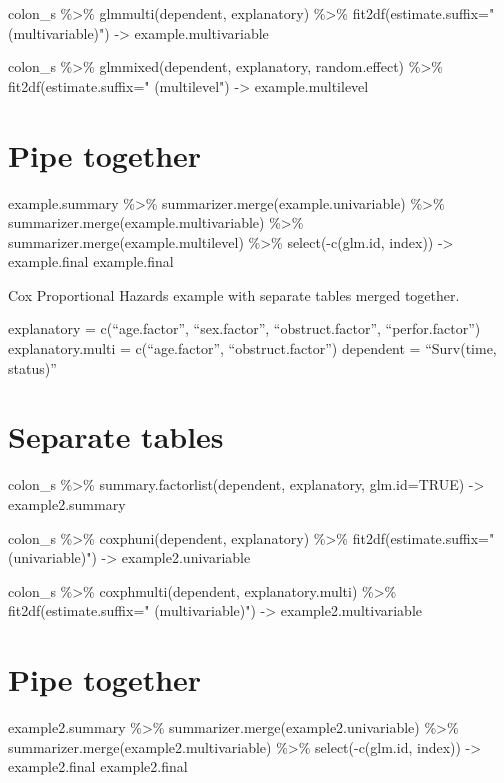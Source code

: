 \documentclass[]{article}
\begin{document}
colon\_s \%\textgreater\% glmmulti(dependent, explanatory)
\%\textgreater\% fit2df(estimate.suffix=" (multivariable)")
-\textgreater{} example.multivariable

colon\_s \%\textgreater\% glmmixed(dependent, explanatory,
random.effect) \%\textgreater\% fit2df(estimate.suffix=" (multilevel")
-\textgreater{} example.multilevel

\hypertarget{pipe-together}{%
\section{Pipe together}\label{pipe-together}}

example.summary \%\textgreater\% summarizer.merge(example.univariable)
\%\textgreater\% summarizer.merge(example.multivariable)
\%\textgreater\% summarizer.merge(example.multilevel) \%\textgreater\%
select(-c(glm.id, index)) -\textgreater{} example.final example.final

Cox Proportional Hazards example with separate tables merged together.

explanatory = c(``age.factor'', ``sex.factor'', ``obstruct.factor'',
``perfor.factor'') explanatory.multi = c(``age.factor'',
``obstruct.factor'') dependent = ``Surv(time, status)''

\hypertarget{separate-tables-1}{%
\section{Separate tables}\label{separate-tables-1}}

colon\_s \%\textgreater\% summary.factorlist(dependent, explanatory,
glm.id=TRUE) -\textgreater{} example2.summary

colon\_s \%\textgreater\% coxphuni(dependent, explanatory)
\%\textgreater\% fit2df(estimate.suffix=" (univariable)")
-\textgreater{} example2.univariable

colon\_s \%\textgreater\% coxphmulti(dependent, explanatory.multi)
\%\textgreater\% fit2df(estimate.suffix=" (multivariable)")
-\textgreater{} example2.multivariable

\hypertarget{pipe-together-1}{%
\section{Pipe together}\label{pipe-together-1}}

example2.summary \%\textgreater\% summarizer.merge(example2.univariable)
\%\textgreater\% summarizer.merge(example2.multivariable)
\%\textgreater\% select(-c(glm.id, index)) -\textgreater{}
example2.final example2.final
\end{document}
